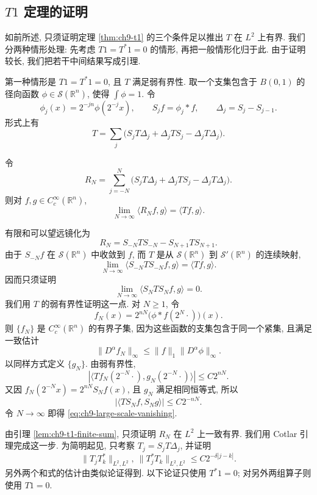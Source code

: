 \subsection{$T1$ 定理的证明}
\label{sec:ch9-t1-proof}

如前所述, 只须证明定理 \ref{thm:ch9-t1} 的三个条件足以推出 $T$ 在 $L^2$ 上有界. 我们分两种情形处理: 先考虑 $T1=T^*1=0$ 的情形, 再把一般情形化归于此. 由于证明较长, 我们把若干中间结果写成引理.

第一种情形是 $T1=T^*1=0$, 且 $T$ 满足弱有界性. 取一个支集包含于 $B(0,1)$ 的径向函数 $\phi\in\mathcal S(\mathbb R^n)$, 使得 $\int\phi=1$. 令
\[
 \phi_j(x)=2^{-jn}\phi(2^{-j}x),\qquad S_jf=\phi_j*f,\qquad \Delta_j=S_j-S_{j-1}.
\]
形式上有
\[
 T=\sum_j\bigl(S_jT\Delta_j+\Delta_jTS_j-\Delta_jT\Delta_j\bigr).
\]

\begin{Lemma}
\label{lem:ch9-t1-finite-sum}
令
\[
 R_N=\sum_{j=-N}^{N}\bigl(S_jT\Delta_j+\Delta_jTS_j-\Delta_jT\Delta_j\bigr).
\]
则对 $f,g\in C_c^\infty(\mathbb R^n)$,
\[
 \lim_{N\to\infty}\langle R_Nf,g\rangle=\langle Tf,g\rangle.
\]
\end{Lemma}

\begin{Proof}
有限和可以望远镜化为
\[
 R_N=S_{-N}TS_{-N}-S_{N+1}TS_{N+1}.
\]
由于 $S_{-N}f$ 在 $\mathcal S(\mathbb R^n)$ 中收敛到 $f$, 而 $T$ 是从 $\mathcal S(\mathbb R^n)$ 到 $\mathcal S'(\mathbb R^n)$ 的连续映射,
\[
 \lim_{N\to\infty}\langle S_{-N}TS_{-N}f,g\rangle=\langle Tf,g\rangle.
\]
因而只须证明
\begin{equation}
\label{eq:ch9-large-scale-vanishing}
 \lim_{N\to\infty}\langle S_NTS_Nf,g\rangle=0.
\tag{9.7}
\end{equation}
我们用 $T$ 的弱有界性证明这一点. 对 $N\geq1$, 令
\[
 f_N(x)=2^{nN}\bigl(\phi*f(2^N\mathbin{\cdot})\bigr)(x).
\]
则 $\{f_N\}$ 是 $C_c^\infty(\mathbb R^n)$ 的有界子集, 因为这些函数的支集包含于同一个紧集, 且满足一致估计
\[
 \|D^\alpha f_N\|_\infty\leq\|f\|_1\|D^\alpha\phi\|_\infty.
\]
以同样方式定义 $\{g_N\}$. 由弱有界性,
\[
 |\langle Tf_N(2^{-N}\mathbin{\cdot}),g_N(2^{-N}\mathbin{\cdot})\rangle|
 \leq C2^{nN}.
\]
又因 $f_N(2^{-N}x)=2^{nN}S_Nf(x)$, 且 $g_N$ 满足相同恒等式, 所以
\[
 |\langle TS_Nf,S_Ng\rangle|\leq C2^{-nN}.
\]
令 $N\to\infty$ 即得 \eqref{eq:ch9-large-scale-vanishing}.
\end{Proof}

\hypertarget{chapter-09-page-218}{}

由引理 \ref{lem:ch9-t1-finite-sum}, 只须证明 $R_N$ 在 $L^2$ 上一致有界. 我们用 Cotlar 引理完成这一步. 为简明起见, 只考察 $T_j=S_jT\Delta_j$, 并证明
\[
 \|T_jT_k^*\|_{L^2,L^2},\ \|T_j^*T_k\|_{L^2,L^2}
 \leq C2^{-\delta|j-k|}.
\]
另外两个和式的估计由类似论证得到. 以下论证只使用 $T^*1=0$; 对另外两组算子则使用 $T1=0$.

